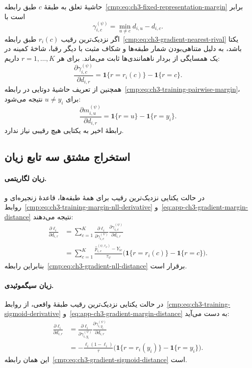 حاشیهٔ تعلق به طبقهٔ $c$ طبق
رابطه~\eqref{cmp:eq:ch3-fixed-representation-margin}
برابر است با
\[
\gamma_{i,c}^{(\psi)}
=\min_{u\ne c}d_{i,u}-d_{i,c}.
\]
اگر نزدیک‌ترین رقیب $r_i(c)$ طبق
رابطه~\eqref{cmp:eq:ch3-gradient-nearest-rival}
یکتا باشد، به دلیل متناهی‌بودن شمار طبقه‌ها و
شکاف مثبت با دیگر رقبا، شاخهٔ کمینه در یک
همسایگی از بردار ناهمانندی‌ها ثابت می‌ماند.
برای هر $r=1,\ldots,K$ داریم:
\begin{equation}\label{eq:app-ch3-gradient-margin-distance}
\frac{\partial\gamma_{i,c}^{(\psi)}}{\partial d_{i,r}}
=\mathbf1\{r=r_i(c)\}-\mathbf1\{r=c\}.
\end{equation}
همچنین از تعریف حاشیهٔ دوتایی در
رابطه~\eqref{cmp:eq:ch3-training-pairwise-margin}،
برای $u\ne y_i$ نتیجه می‌شود:
\begin{equation}\label{eq:app-ch3-gradient-pairwise-distance}
\frac{\partial m_{i,u}^{(\psi)}}{\partial d_{i,r}}
=\mathbf1\{r=u\}-\mathbf1\{r=y_i\}.
\end{equation}
رابطهٔ اخیر به یکتایی هیچ رقیبی نیاز ندارد.

\subsection{استخراج مشتق سه تابع زیان}
\label{app:ch3-gradient-loss-three-derivatives}

\paragraph{زیان لگاریتمی.}
در حالت یکتایی نزدیک‌ترین رقیب برای همهٔ
طبقه‌ها، قاعدهٔ زنجیره‌ای و
روابط~\eqref{cmp:eq:ch3-training-margin-nll-derivative}
و~\eqref{eq:app-ch3-gradient-margin-distance}
نتیجه می‌دهند:
\[
\begin{aligned}
\frac{\partial\ell_i}{\partial d_{i,r}}
&=\sum_{c=1}^{K}
\frac{\partial\ell_i}{\partial\gamma_{i,c}^{(\psi)}}
\frac{\partial\gamma_{i,c}^{(\psi)}}{\partial d_{i,r}}\\
&=\sum_{c=1}^{K}
\frac{\widehat p_{i,c}^{(\psi,\tau_\psi)}-Y_{ic}}{\tau_\psi}
\bigl(\mathbf1\{r=r_i(c)\}-\mathbf1\{r=c\}\bigr).
\end{aligned}
\]
بنابراین رابطه~\eqref{cmp:eq:ch3-gradient-nll-distance}
برقرار است.

\paragraph{زیان سیگموئیدی.}
در حالت یکتایی نزدیک‌ترین رقیب طبقهٔ واقعی، از
روابط~\eqref{cmp:eq:ch3-training-sigmoid-derivative}
و~\eqref{eq:app-ch3-gradient-margin-distance}
به دست می‌آید:
\[
\begin{aligned}
\frac{\partial\ell_i}{\partial d_{i,r}}
&=\frac{\partial\ell_i}{\partial\gamma_{i,y_i}^{(\psi)}}
\frac{\partial\gamma_{i,y_i}^{(\psi)}}{\partial d_{i,r}}\\
&=-\frac{\ell_i(1-\ell_i)}{\tau}
\bigl(\mathbf1\{r=r_i(y_i)\}-\mathbf1\{r=y_i\}\bigr).
\end{aligned}
\]
این همان رابطه~\eqref{cmp:eq:ch3-gradient-sigmoid-distance}
است.

